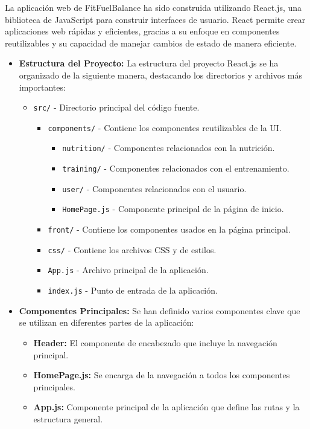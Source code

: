 La aplicación web de FitFuelBalance ha sido construida utilizando React.js, una biblioteca de JavaScript para construir interfaces de usuario. React permite crear aplicaciones web rápidas y eficientes, gracias a su enfoque en componentes reutilizables y su capacidad de manejar cambios de estado de manera eficiente.

\begin{itemize}
    \item \textbf{Estructura del Proyecto:} La estructura del proyecto React.js se ha organizado de la siguiente manera, destacando los directorios y archivos más importantes:
    \begin{itemize}
        \item \texttt{src/} - Directorio principal del código fuente.
        \begin{itemize}
            \item \texttt{components/} - Contiene los componentes reutilizables de la UI.
            \begin{itemize}
              \item \texttt{nutrition/} - Componentes relacionados con la nutrición.
              \item \texttt{training/} - Componentes relacionados con el entrenamiento.
              \item \texttt{user/} - Componentes relacionados con el usuario.
              \item \texttt{HomePage.js} - Componente principal de la página de inicio.
            \end{itemize}
            \item \texttt{front/} - Contiene los componentes usados en la página principal.
            \item \texttt{css/} - Contiene los archivos CSS y de estilos.
            \item \texttt{App.js} - Archivo principal de la aplicación.
            \item \texttt{index.js} - Punto de entrada de la aplicación.
        \end{itemize}
    \end{itemize}

    \item \textbf{Componentes Principales:} Se han definido varios componentes clave que se utilizan en diferentes partes de la aplicación:
    \begin{itemize}
        \item \textbf{Header:} El componente de encabezado que incluye la navegación principal.
        \item \textbf{HomePage.js:} Se encarga de la navegación a todos los componentes principales.
        \item \textbf{App.js:} Componente principal de la aplicación que define las rutas y la estructura general.
    \end{itemize}


\end{itemize}
